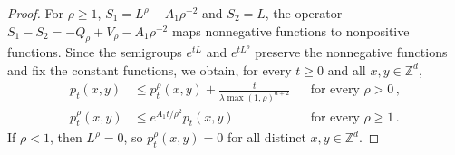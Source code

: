 \documentclass[11pt]{amsart}
\numberwithin{equation}{section}
\newcommand{\Z}{\mathbb{Z}}
\begin{document}
\begin{proof}
For $\rho \geq 1$, $S_1 = L^\rho - A_1 \rho^{-2}$ and $S_2 = L$, the operator $S_1 - S_2 = - Q_\rho + V_\rho - A_1 \rho^{-2}$ maps nonnegative functions to nonpositive functions.
Since the semigroups $e^{tL}$ and $e^{t L^\rho}$ preserve the nonnegative functions and fix the constant functions, we obtain, for every $t \geq 0$ and all $x, y \in \Z^d$,
\begin{equation} \label{eq:hk.truncation}
\begin{aligned}
    p_t(x,y) & \leq p^\rho_t(x,y) + \frac{t}{\lambda \max(1, \rho)^{d+2}} && \text{for every } \rho > 0\,, \\
    p^\rho_t(x,y) & \leq e^{A_1 t / \rho^2} p_t(x,y) && \text{for every } \rho \geq 1\,.
\end{aligned}
\end{equation}
If $\rho < 1$, then $L^\rho = 0$, so $p^\rho_t(x,y) = 0$ for all distinct $x, y \in \Z^d$.


\end{proof}
\end{document}
